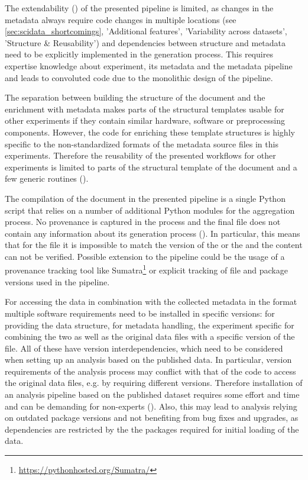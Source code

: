 The extendability () of the presented pipeline is limited, as changes in the metadata always require code changes in multiple locations (see \cref{sec:scidata_shortcomings}, 'Additional features', 'Variability across datasets', 'Structure \& Reusability') and dependencies between structure and metadata need to be explicitly implemented in the  generation process. This requires expertise knowledge about experiment, its metadata and the metadata pipeline and leads to convoluted code due to the monolithic design of the pipeline.

The separation between building the structure of the  document and the enrichment with metadata makes parts of the structural templates usable for other experiments if they contain similar hardware, software or preprocessing components. However, the code for enriching these template structures is highly specific to the non-standardized formats of the metadata source files in this experiments. Therefore the reusability of the presented workflows for other experiments is limited to parts of the structural template of the  document and a few generic routines ().

The compilation of the  document in the presented pipeline is a single Python script that relies on a number of additional Python modules for the aggregation process. No provenance is captured in the process and the final  file does not contain any information about its generation process (). In particular, this means that for the  file it is impossible to match the version of the  or the  and the content can not be verified. Possible extension to the pipeline could be the usage of a provenance tracking tool like Sumatra\footnote{\url{https://pythonhosted.org/Sumatra/}} or explicit tracking of file and package versions used in the pipeline.

For accessing the data in combination with the collected metadata in the  format multiple software requirements need to be installed in specific versions:  for providing the data structure,  for metadata handling, the experiment specific  for combining the two as well as the original data files with a specific version of the  file. All of these have version interdependencies, which need to be considered when setting up an analysis based on the published data. In particular, version requirements of the analysis process may conflict with that of the code to access the original data files, e.g. by requiring different  versions. Therefore installation of an analysis pipeline based on the published dataset requires some effort and time and can be demanding for non-experts (). Also, this may lead to analysis relying on outdated package versions and not benefiting from bug fixes and upgrades, as dependencies are restricted by the the packages required for initial loading of the data.

